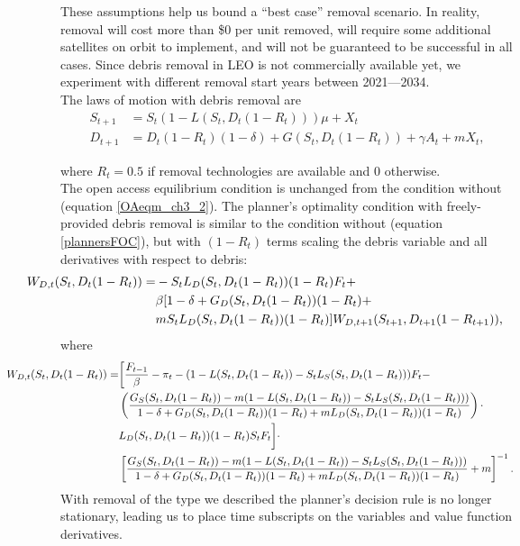 \documentclass[12pt]{article}
\begin{document}
These assumptions help us bound a ``best case'' removal scenario. In reality, removal will cost more than \$0 per unit removed, will require some additional satellites on orbit to implement, and will not be guaranteed to be successful in all cases. Since debris removal in LEO is not commercially available yet, we experiment with different removal start years between 2021---2034.\\

The laws of motion with debris removal are
\begin{align}
\label{satelliteLoM_rem}
S_{t+1} &= S_t(1 - L(S_t,D_t(1-R_t)))\mu + X_t \\
\label{debrisLoM_rem}
D_{t+1} &= D_t(1-R_t)(1-\delta) + G(S_t,D_t(1-R_t)) + \gamma A_t + mX_t,
\end{align}

where $R_t = 0.5$ if removal technologies are available and $0$ otherwise.  \\

The open access equilibrium condition is unchanged from the condition without (equation \ref{OAeqm_ch3_2}). The planner's optimality condition with freely-provided debris removal is similar to the condition without (equation \ref{plannersFOC}), but with $(1-R_t)$ terms scaling the debris variable and all derivatives with respect to debris:
\begin{align}
\hspace{-1.25cm}	W_{D,t}(S_t,D_t(1-R_t)) =& - S_t L_D(S_t,D_t(1-R_t))(1-R_t) F_t + \nonumber \\
& \beta [1 - \delta + G_D(S_t,D_t(1-R_t))(1-R_t) + \nonumber \\
& m S_tL_D(S_t,D_t(1-R_t))(1-R_t)] W_{D,t+1}(S_{t+1},D_{t+1}(1-R_{t+1})),
\end{align}
where
\begin{align}
\hspace{-1.75cm}	W_{D,t}(S_t,D_t(1-R_t)) =& \bigg[ \frac{F_{t-1}}{\beta} - \pi_t - (1 - L(S_t,D_t(1-R_t)) - S_t L_S(S_t,D_t(1-R_t)))F_t - \nonumber \\
& \left( \frac{G_S(S_t,D_t(1-R_t)) - m(1 - L(S_t,D_t(1-R_t)) - S_tL_S(S_t,D_t(1-R_t)))}{1 - \delta + G_D(S_t,D_t(1-R_t))(1-R_t) + m L_D(S_t,D_t(1-R_t))(1-R_t)} \right) \cdot \nonumber \\
& L_D(S_t,D_t(1-R_t))(1-R_t) S_t F_t  \bigg] \cdot \nonumber \\
& \left[ \frac{G_S(S_t,D_t(1-R_t)) - m(1 - L(S_t,D_t(1-R_t)) - S_tL_S(S_t,D_t(1-R_t)))}{1 - \delta + G_D(S_t,D_t(1-R_t))(1-R_t) + m L_D(S_t,D_t(1-R_t))(1-R_t)} + m \right]^{-1}.
\end{align}
With removal of the type we described the planner's decision rule is no longer stationary, leading us to place time subscripts on the variables and value function derivatives. \\
\end{document}

